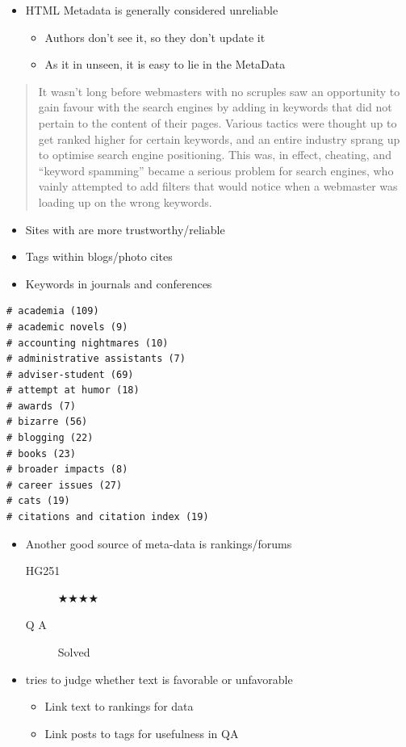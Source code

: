 \documentclass[a4paper,landscape,headrule,footrule,xetex]{foils}
\begin{document}
\begin{itemize}
\item HTML Metadata is generally considered unreliable
  \begin{itemize}
  \item Authors don't see it, so they don't update it
  \item As it in unseen, it is easy to lie in the MetaData
  \end{itemize}
\end{itemize}
\begin{quotation} \small 
  It wasn’t long before webmasters with no scruples saw an opportunity to gain favour with the search engines by adding in keywords that did not pertain to the content of their pages. Various tactics were thought up to get ranked higher for certain keywords, and an entire industry sprang up to optimise search engine positioning. This was, in effect, cheating, and “keyword spamming” became a serious problem for search engines, who vainly attempted to add filters that would notice when a webmaster was loading up on the wrong keywords.
\end{quotation}



\begin{itemize}
\item Sites with  are more trustworthy/reliable
\item Tags within blogs/photo cites
\item Keywords in journals and conferences
\end{itemize}

\begin{verbatim}
# academia (109)
# academic novels (9)
# accounting nightmares (10)
# administrative assistants (7)
# adviser-student (69)
# attempt at humor (18)
# awards (7)
# bizarre (56)
# blogging (22)
# books (23)
# broader impacts (8)
# career issues (27)
# cats (19)
# citations and citation index (19) 
\end{verbatim}


\MyLogo{}

\begin{itemize}
\item Another good source of meta-data is rankings/forums
  \begin{description}
  \item[HG251] ★★★★
  \item[Q A] Solved
  \end{description}
\item {} tries to judge whether text is favorable or unfavorable
  \begin{itemize}
  \item Link text to rankings for data
  \item Link posts to tags for usefulness in QA
  \end{itemize}
\end{itemize}
\end{document}
